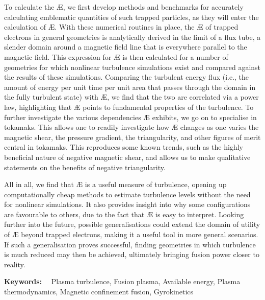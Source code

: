 To calculate the \AE{}, we first develop methods and benchmarks for accurately calculating emblematic quantities of such trapped particles, as they will enter the calculation of \AE{}. With these numerical routines in place, the \AE{} of trapped electrons in general geometries is analytically derived in the limit of a flux tube, a slender domain around a magnetic field line that is everywhere parallel to the magnetic field. This expression for \AE{} is then calculated for a number of geometries for which nonlinear turbulence simulations exist and compared against the results of these simulations. Comparing the turbulent energy flux (i.e., the amount of energy per unit time per unit area that passes through the domain in the fully turbulent state) with \AE{}, we find that the two are correlated via a power law, highlighting that \AE{} points to fundamental properties of the turbulence. To further investigate the various dependencies \AE{} exhibits, we go on to specialise in tokamaks. This allows one to readily investigate how \AE{} changes as one varies the magnetic shear, the pressure gradient, the triangularity, and other figures of merit central in tokamaks. This reproduces some known trends, such as the highly beneficial nature of negative magnetic shear, and allows us to make qualitative statements on the benefits of negative triangularity. \par 
All in all, we find that \AE{} is a useful measure of turbulence, opening up computationally cheap methods to estimate turbulence levels without the need for nonlinear simulations. It also provides insight into why some configurations are favourable to others, due to the fact that \AE{} is easy to interpret. Looking further into the future, possible generalisations could extend the domain of utility of \AE{} beyond trapped electrons, making it a useful tool in more general scenarios. If such a generalisation proves successful, finding geometries in which turbulence is much reduced may then be achieved, ultimately bringing fusion power closer to reality.

\vspace*{11pt}\noindent
\textbf{Keywords:} \ \ Plasma turbulence, Fusion plasma, Available energy, Plasma thermodynamics, Magnetic confinement fusion, Gyrokinetics